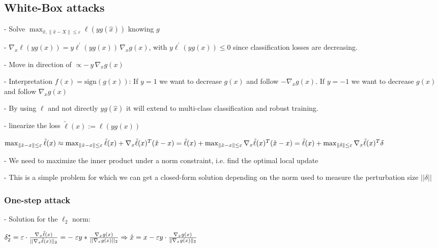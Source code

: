 \subsection*{White-Box attacks}

- Solve $\operatorname*{max}_{\hat{x},\|\hat{x}-X\|\leq\varepsilon}\ell(yg(\hat{x}))$ knowing $g$

- $\nabla_{x}{\ell}(y g(x))=y\ell^{\prime}(y g(x))\,\nabla_{x}g(x)$, with $y\ell^{\prime}(y g(x)) \leq 0$ since classification losses are decreasing.

- Move in direction of $\propto-\,y\,\nabla_{x}g(x)$

- Interpretation $f(x)=\mathrm{{sign}}(g(x))$: If $y=1$ we want to decrease $g(x)$ and follow $-\nabla_{x}g(x)$. If $y=-1$ we want to decrease $g(x)$ and follow $\nabla_{x}g(x)$

- By using $\ell$ and not directly $yg(\hat{x})$ it will extend to multi-class classification and robust training.

- linearize the loss $\tilde{\ell}(x):={\ell}(y g(x))$

$\operatorname*{max}_{\|{\hat{x}}-x\|\leq\varepsilon}{\tilde{\ell}}(x)\\\approx\operatorname*{max}_{\|{\hat{x}}-x\|\leq\varepsilon}{\tilde{\ell}}(x)+\nabla_{x}{\tilde{\ell}}(x)^{T}({\hat{x}}-x) \\={\tilde{\ell}}(x)+\operatorname*{max}_{\|{\hat{x}}-x\|\leq\varepsilon}{\nabla}_{x}{\tilde{\ell}}(x)^{T}({\hat{x}}-x) \\={\tilde{\ell}}(x)+\operatorname*{max}_{\|\delta\|\leq\varepsilon}{\nabla}_{x}{\tilde{\ell}}(x)^{T}{\delta}$

- We need to maximize the inner product under a norm constraint, i.e. find the optimal local update

- This is a simple problem for which we can get a closed-form solution depending on the norm used to measure the perturbation size $||\delta||$

\subsubsection*{One-step attack}

- Solution for the $\ell_2$ norm:

$\delta_{2}^{\star}=\varepsilon\cdot\frac{\nabla_{x}\tilde{\ell}(x)}{||\nabla_{x}\tilde{\ell}(x)||_{2}}=-\;\varepsilon y*\frac{\nabla_{x}g(x)}{||\nabla_{x}g(x)||_{2}} \Rightarrow \\ \hat{x}=x-\varepsilon y\cdot\frac{\nabla_{x}g(x)}{\|\nabla_{x}g(x)\|_{2}}$

